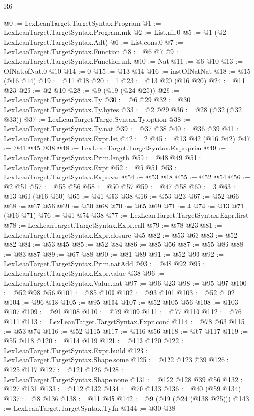 \begin{lexlean}{R6}
\begin{coremodule}
@0 := LexLeanTarget.TargetSyntax.Program
@1 := LexLeanTarget.TargetSyntax.Program.mk
@2 := List.nil.{0}
@5 := @1 (@2 LexLeanTarget.TargetSyntax.Adt)
@6 := List.cons.{0}
@7 := LexLeanTarget.TargetSyntax.Function
@8 := @6 @7
@9 := LexLeanTarget.TargetSyntax.Function.mk
@10 := Nat
@11 := @6 @10
@13 := OfNat.ofNat.{0} @10
@14 := 0
@15 := @13 @14
@16 := instOfNatNat
@18 := @15 (@16 @14)
@19 := @11 @18
@20 := 1
@23 := @13 @20 (@16 @20)
@24 := @11 @23
@25 := @2 @10
@28 := @9 (@19 (@24 @25))
@29 := LexLeanTarget.TargetSyntax.Ty
@30 := @6 @29
@32 := @30 LexLeanTarget.TargetSyntax.Ty.bytes
@33 := @2 @29
@36 := @28 (@32 (@32 @33))
@37 := LexLeanTarget.TargetSyntax.Ty.option
@38 := LexLeanTarget.TargetSyntax.Ty.nat
@39 := @37 @38
@40 := @36 @39
@41 := LexLeanTarget.TargetSyntax.Expr.let
@42 := 2
@45 := @13 @42 (@16 @42)
@47 := @41 @45 @38
@48 := LexLeanTarget.TargetSyntax.Expr.prim
@49 := LexLeanTarget.TargetSyntax.Prim.length
@50 := @48 @49
@51 := LexLeanTarget.TargetSyntax.Expr
@52 := @6 @51
@53 := LexLeanTarget.TargetSyntax.Expr.var
@54 := @53 @18
@55 := @52 @54
@56 := @2 @51
@57 := @55 @56
@58 := @50 @57
@59 := @47 @58
@60 := 3
@63 := @13 @60 (@16 @60)
@65 := @41 @63 @38
@66 := @53 @23
@67 := @52 @66
@68 := @67 @56
@69 := @50 @68
@70 := @65 @69
@71 := 4
@74 := @13 @71 (@16 @71)
@76 := @41 @74 @38
@77 := LexLeanTarget.TargetSyntax.Expr.first
@78 := LexLeanTarget.TargetSyntax.Expr.call
@79 := @78 @23
@81 := LexLeanTarget.TargetSyntax.Expr.closure @45
@82 := @53 @63
@83 := @52 @82
@84 := @53 @45
@85 := @52 @84
@86 := @85 @56
@87 := @55 @86
@88 := @83 @87
@89 := @67 @88
@90 := @81 @89
@91 := @52 @90
@92 := LexLeanTarget.TargetSyntax.Prim.natAdd
@93 := @48 @92
@95 := LexLeanTarget.TargetSyntax.Expr.value @38
@96 := LexLeanTarget.TargetSyntax.Value.nat
@97 := @96 @23
@98 := @95 @97
@100 := @52 @98 @56
@101 := @85 @100
@102 := @93 @101
@103 := @52 @102
@104 := @96 @18
@105 := @95 @104
@107 := @52 @105 @56
@108 := @103 @107
@109 := @91 @108
@110 := @79 @109
@111 := @77 @110
@112 := @76 @111
@113 := LexLeanTarget.TargetSyntax.Expr.cond
@114 := @78 @63
@115 := @53 @74
@116 := @52 @115
@117 := @116 @56
@118 := @67 @117
@119 := @55 @118
@120 := @114 @119
@121 := @113 @120
@122 := LexLeanTarget.TargetSyntax.Expr.build
@123 := LexLeanTarget.TargetSyntax.Shape.some
@125 := @122 @123 @39
@126 := @125 @117
@127 := @121 @126
@128 := LexLeanTarget.TargetSyntax.Shape.none
@131 := @122 @128 @39 @56
@132 := @127 @131
@133 := @112 @132
@134 := @70 @133
@136 := @40 (@59 @134)
@137 := @8 @136
@138 := @11 @45
@142 := @9 (@19 (@24 (@138 @25)))
@143 := LexLeanTarget.TargetSyntax.Ty.fn
@144 := @30 @38

\end{coremodule}
\end{lexlean}
